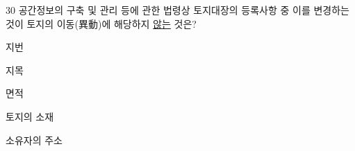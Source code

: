 \begin{question}{30}
공간정보의 구축 및 관리 등에 관한 법령상 토지대장의 등록사항 중 이를 변경하는 것이 토지의 이동(異動)에 해당하지 \uline{않는} 것은?
\begin{choices}
  \item 지번
  \item 지목
  \item 면적
  \item 토지의 소재
  \item 소유자의 주소
\end{choices}
\end{question}
